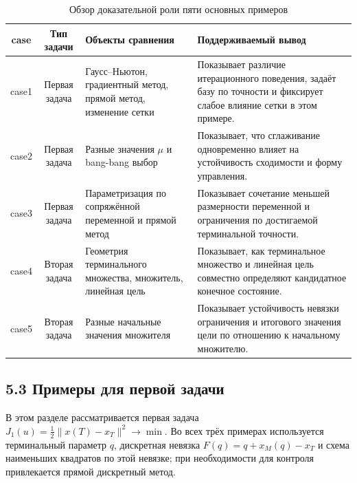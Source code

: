\documentclass[a4paper,12pt]{article}
\begin{document}
\begin{table}[htbp]
\centering
\small
\caption{Обзор доказательной роли пяти основных примеров}
\label{tab:case-overview}
\begin{tabular}{|c|c|>{\raggedright\arraybackslash}p{3.4cm}|>{\raggedright\arraybackslash}p{7.0cm}|}
\hline
case & Тип задачи & Объекты сравнения & Поддерживаемый вывод \\
\hline
case1 & Первая задача & Гаусс--Ньютон, градиентный метод, прямой метод, изменение сетки & Показывает различие итерационного поведения, задаёт базу по точности и фиксирует слабое влияние сетки в этом примере. \\
\hline
case2 & Первая задача & Разные значения $\mu$ и bang-bang выбор & Показывает, что сглаживание одновременно влияет на устойчивость сходимости и форму управления. \\
\hline
case3 & Первая задача & Параметризация по сопряжённой переменной и прямой метод & Показывает сочетание меньшей размерности переменной и ограничения по достигаемой терминальной точности. \\
\hline
case4 & Вторая задача & Геометрия терминального множества, множитель, линейная цель & Показывает, как терминальное множество и линейная цель совместно определяют кандидатное конечное состояние. \\
\hline
case5 & Вторая задача & Разные начальные значения множителя & Показывает устойчивость невязки ограничения и итогового значения цели по отношению к начальному множителю. \\
\hline
\end{tabular}
\end{table}

\subsection{5.3 Примеры для первой задачи}

В этом разделе рассматривается первая задача $J_1(u)=\frac12\|x(T)-x_T\|^2\to\min$. Во всех трёх примерах используется терминальный параметр $q$, дискретная невязка $F(q)=q+x_M(q)-x_T$ и схема наименьших квадратов по этой невязке; при необходимости для контроля привлекается прямой дискретный метод.
\end{document}
